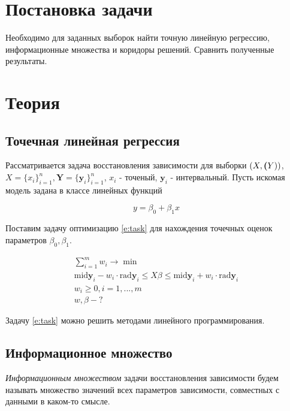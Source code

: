 \documentclass[a4paper,12pt]{article}
\begin{document}
    
    \newpage

    \tableofcontents
    \listoffigures
    \newpage

    \section{Постановка задачи}
    Необходимо для заданных выборок найти точную линейную регрессию, информационные множества и коридоры решений. Сравнить полученные результаты.
    \section{Теория}
    \subsection{Точечная линейная регрессия}
    \quad Рассматривается задача восстановления зависимости для выборки
    $ (X, \textbf(Y))$, $ X = \{x_i\}_{i=1}^{n}, \textbf{Y} = \{\textbf{y}_i\}_{i=1}^{n} $,
    $ x_i $ - точеный, $ \textbf{y}_i $ - интервальный.
    Пусть искомая модель задана в классе линейных функций

    \begin{equation}
        y = \beta_0 + \beta_1 x
        \label{e:model}
    \end{equation}

    Поставим задачу оптимизацию \ref{e:task} для нахождения точечных оценок
    параметров $ \beta_0, \beta_1 $.

    \begin{equation}
        \begin{gathered}
            \sum_{i = 1}^{m}w_{i} \to \min \\
            \text{mid}\textbf{y}_{i} - w_{i} \cdot \text{rad}\textbf{y}_{i} \leq X\beta \leq \text{mid}\textbf{y}_{i} + w_{i} \cdot \text{rad}\textbf{y}_{i} \\
            w_{i} \geq 0, i = 1, ..., m \\
            w, \beta - ?
        \end{gathered}
        \label{e:task}
    \end{equation}
    
    Задачу \ref{e:task} можно решить методами линейного программирования.

    \subsection{Информационное множество}
    \quad \textsl{Информационным множеством} задачи восстановления зависимости
    будем называть множество значений всех параметров зависимости,
    совместных с данными в каком-то смысле. 
\end{document}
